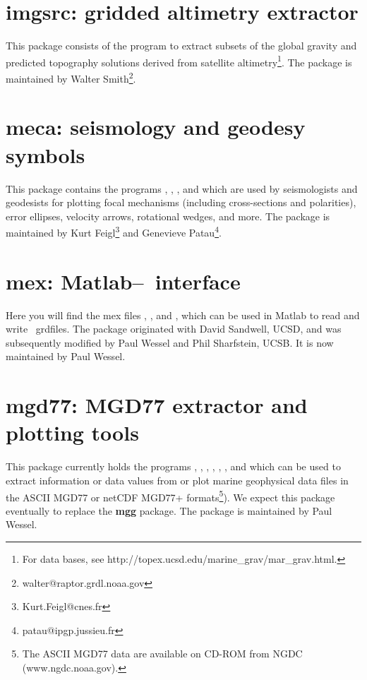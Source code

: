 \section{imgsrc: gridded altimetry extractor}

This package consists of the program  to
extract subsets of the global gravity and predicted topography
solutions derived from satellite altimetry\footnote{For data bases,
see http://topex.ucsd.edu/marine\_grav/mar\_grav.html.}.  The package
is maintained by Walter Smith\footnote{walter@raptor.grdl.noaa.gov}.

\section{meca: seismology and geodesy symbols}

This package contains the programs , ,
, and  which are used
by seismologists and geodesists for plotting focal mechanisms (including
cross-sections and polarities), error ellipses, velocity arrows, rotational
wedges, and more.  The package is maintained by
Kurt Feigl\footnote{Kurt.Feigl@cnes.fr} and
Genevieve Patau\footnote{patau@ipgp.jussieu.fr}.

\section{mex: Matlab--\gmt\ interface}

Here you will find the mex files , ,
and , which can be used in Matlab to read and write
\GMT\ grdfiles.  The package originated with David Sandwell, UCSD,
and was subsequently modified by Paul Wessel and Phil Sharfstein, UCSB.
It is now maintained by Paul Wessel.

\section{mgd77: MGD77 extractor and plotting tools}

This package currently holds the programs , , ,
, , , and  which can be
used to extract information or data values from or plot marine geophysical
data files in the ASCII MGD77 or netCDF MGD77+ formats\footnote{The ASCII MGD77 data are available on CD-ROM from NGDC
(www.ngdc.noaa.gov).}).  We expect this package eventually to replace the {\bf mgg} package.
The package is maintained by Paul Wessel.

